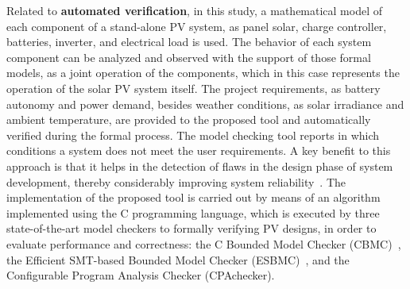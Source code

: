 Related to \textbf{automated verification}, in this study, a mathematical model of each component of a stand-alone PV system, as panel solar, charge controller, batteries, inverter, and electrical load is used. The behavior of each system component can be analyzed and observed with the support of those formal models, as a joint operation of the components, which in this case represents the operation of the solar PV system itself. The project requirements, as battery autonomy and power demand, besides weather conditions, as solar irradiance and ambient temperature, are provided to the proposed tool and automatically verified during the formal process. The model checking tool reports in which conditions a system does not meet the user requirements. A key benefit to this approach is that it helps in the detection of flaws in the design phase of system development, thereby considerably improving system reliability~\cite{Akram2018}. 
The implementation of the proposed tool is carried out by means of an algorithm implemented using the C programming language, which is executed by three state-of-the-art model checkers to formally verifying PV designs, in order to evaluate performance and correctness: the C Bounded Model Checker (CBMC)~\cite{Kroening}, the Efficient SMT-based Bounded Model Checker (ESBMC)~\cite{esbmc2018}, and the Configurable Program Analysis Checker (CPAchecker).

